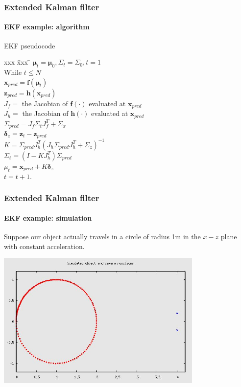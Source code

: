 \documentclass[aspectratio=169]{beamer}
\renewcommand{\vec}[1]{\boldsymbol{#1}}
\begin{document}
\begin{frame}
\frametitle{Extended Kalman filter}
\framesubtitle{EKF example: algorithm}

\begin{block}{EKF pseudocode}
\begin{tabbing}
xxx \= xxx \= \kill
$\vec{\mu}_t = \vec{\mu}_0, \Sigma_t = \Sigma_0, t = 1$\\
While $t \leq N$\\
\> $\vec{x}_{pred} = \vec{f}(\vec{\mu}_t)$ \\
\> $\vec{z}_{pred} = \vec{h}(\vec{x}_{pred})$\\
\> $J_f = $ the Jacobian of $\vec{f}(\cdot)$ evaluated at
   $\vec{x}_{pred}$\\
\> $J_h = $ the Jacobian of $\vec{h}(\cdot)$ evaluated at
   $\vec{x}_{pred}$\\
\> $\Sigma_{pred} = J_f \Sigma_t J_f^T + \Sigma_x$ \\
\> $\vec{\delta}_z = \vec{z}_t - \vec{z}_{pred}$ \\
\> $K = \Sigma_{pred} J_h^T ( J_h \Sigma_{pred} J_h^T + \Sigma_z
)^{-1}$\\
\> $\Sigma_t = ( I - K J_h^T ) \Sigma_{pred}$\\
\> $\mu_t = \vec{x}_{pred} + K \vec{\delta}_z$\\
\> $t = t + 1$.
\end{tabbing}
\end{block}

\end{frame}

\begin{frame}
\frametitle{Extended Kalman filter}
\framesubtitle{EKF example: simulation}

Suppose our object actually travels in a circle of radius 1m in the
$x-z$ plane with constant acceleration.

\begin{center}
\includegraphics[width=4in]{simpos}
\end{center}

\end{frame}
\end{document}
